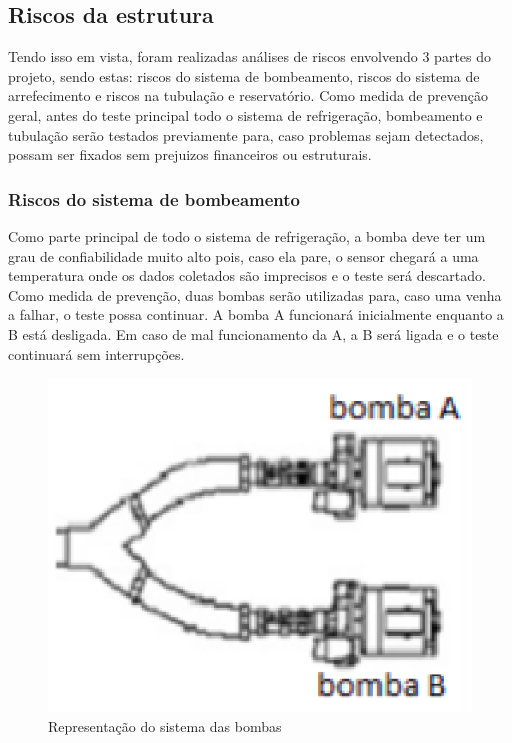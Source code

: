 \subsection{Riscos da estrutura}

Tendo  isso em vista, foram realizadas análises de riscos envolvendo 3 partes do projeto, sendo estas: riscos do sistema de bombeamento, riscos do sistema de arrefecimento e riscos na tubulação e reservatório.
Como medida de prevenção geral, antes do teste principal todo o sistema de refrigeração, bombeamento e tubulação serão testados previamente para, caso problemas sejam detectados, possam ser fixados sem prejuizos financeiros ou estruturais.

\subsubsection{Riscos do sistema de bombeamento}

Como parte principal de todo o sistema de refrigeração, a bomba deve ter um grau de confiabilidade muito alto pois, caso ela pare, o sensor chegará a uma temperatura onde os dados coletados são imprecisos e o teste será descartado.
Como medida de prevenção, duas bombas serão utilizadas para, caso uma venha a falhar, o teste possa continuar. A bomba A funcionará inicialmente enquanto a B está desligada. Em caso de mal funcionamento da A, a B será ligada e o teste continuará sem interrupções. 

\begin{figure}[!htb]                                                               
   \centering                                                                      
   \includegraphics[scale=0.6, keepaspectratio=true]{figuras/conexaobombas.eps} 
   \caption{Representação do sistema das bombas}
\end{figure}

